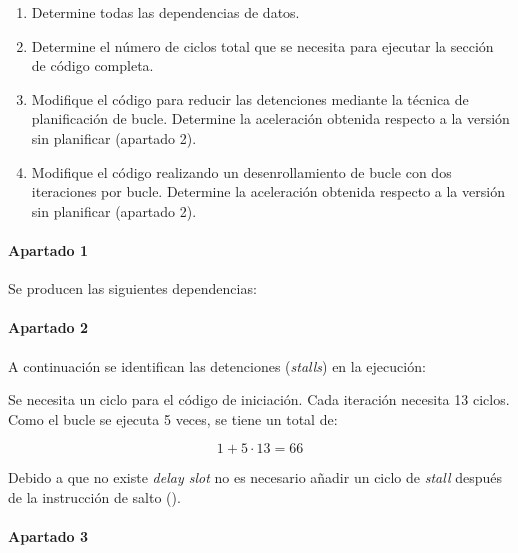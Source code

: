 \begin{enumerate}

  \item Determine todas las dependencias de datos.

  \item Determine el número de ciclos total que se necesita para ejecutar la
sección de código completa. 

  \item Modifique el código para reducir las detenciones mediante la técnica de
planificación de bucle. Determine la aceleración obtenida respecto a la versión
sin planificar (apartado 2). 

  \item Modifique el código realizando un desenrollamiento de bucle con dos
iteraciones por bucle. Determine la aceleración obtenida respecto a la versión
sin planificar (apartado 2). 

\end{enumerate}


\begin{acsolution}
\end{acsolution}

\paragraph{Apartado 1}

Se producen las siguientes dependencias:



\paragraph{Apartado 2}

A continuación se identifican las detenciones (\emph{stalls}) en la ejecución:



Se necesita un ciclo para el código de iniciación. Cada iteración necesita 13
ciclos. Como el bucle se ejecuta 5 veces, se tiene un total de:

\[
1+5 \cdot 13 = 66
\]

Debido a que no existe \emph{delay slot} no es necesario añadir un ciclo de
\emph{stall} después de la instrucción de salto ().

\paragraph{Apartado 3}

